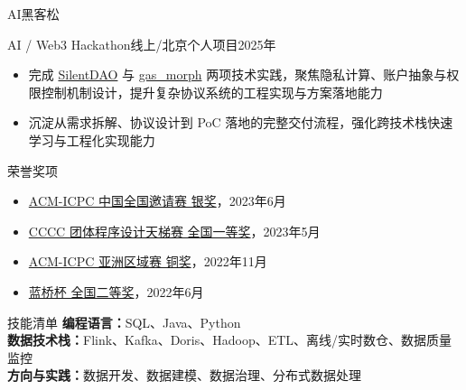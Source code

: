 \documentclass{resume} %
\begin{document}

\begin{rSection}{AI黑客松}
\begin{rSubsection}{AI / Web3 Hackathon}{线上/北京}{\textup{个人项目}}{\textup{2025年}}
\begin{itemize}
\setlength\itemsep{-0.2em}
\item 完成 \href{https://github.com/Noe1017/SilentDAO}{SilentDAO} 与 \href{https://github.com/Noe1017/gas_morph}{gas\_morph} 两项技术实践，聚焦隐私计算、账户抽象与权限控制机制设计，提升复杂协议系统的工程实现与方案落地能力
\item 沉淀从需求拆解、协议设计到 PoC 落地的完整交付流程，强化跨技术栈快速学习与工程化实现能力
\end{itemize}
\end{rSubsection}
\end{rSection}



\begin{rSection}{荣誉奖项}
\begin{itemize}
\setlength\itemsep{-0.2em}
\item \href{https://jixiangli.xyz/awards/2024-ICPC-China-National-Invitational-Contest-Jixiang-Li-MEDAL.pdf}{ACM-ICPC 中国全国邀请赛 银奖}，2023年6月
\item \href{https://jixiangli.xyz/awards/CCCC-TPD-Ladder-Contest.pdf}{CCCC 团体程序设计天梯赛 全国一等奖}，2023年5月
\item \href{https://jixiangli.xyz/awards/2023-Asia-Xian-Regional-Contest-Jixiang-Li-MEDAL.pdf}{ACM-ICPC 亚洲区域赛 铜奖}，2022年11月
\item \href{https://jixiangli.xyz/awards/Lanqiao-Cup.jpg}{蓝桥杯 全国二等奖}，2022年6月
\end{itemize}
\end{rSection}


\begin{rSection}{技能清单}
\textbf{编程语言：}SQL、Java、Python\\
\textbf{数据技术栈：}Flink、Kafka、Doris、Hadoop、ETL、离线/实时数仓、数据质量监控\\
\textbf{方向与实践：}数据开发、数据建模、数据治理、分布式数据处理
\end{rSection}
\end{document}
